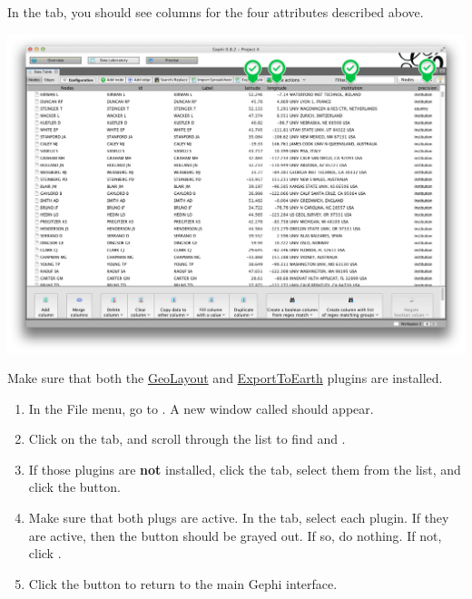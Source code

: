 \documentclass[letterpaper,10pt,english]{sphinxmanual}
\begin{document}
In the  tab, you should see columns for the four attributes described
above.

{\hfill\includegraphics{geo1.png}\hfill}

Make sure that both the \href{https://marketplace.gephi.org/plugin/geolayout/}{GeoLayout}
and \href{https://marketplace.gephi.org/plugin/exporttoearth/}{ExportToEarth} plugins are
installed.
\begin{enumerate}
\item {} 
In the File menu, go to . A new window called  should
appear.

\item {} 
Click on the  tab, and scroll through the list to find 
and .

\item {} 
If those plugins are \textbf{not} installed, click the  tab, select
them from the list, and click the  button.

\item {} 
Make sure that both plugs are active. In the  tab, select each plugin.
If they are active, then the  button should be grayed out. If so, do
nothing. If not, click .

\item {} 
Click the  button to return to the main Gephi interface.

\end{enumerate}
\end{document}
